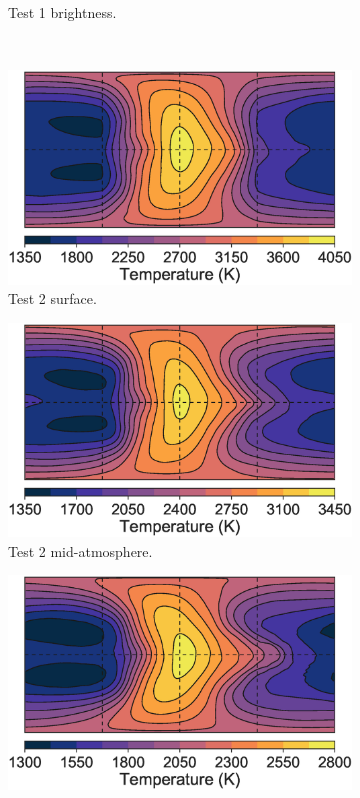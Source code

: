 \begin{figure}
\begin{subfigure}[t]{0.32\textwidth}
    \caption{Test 1 brightness.}
    \label{fig:free-h-shear}
  \end{subfigure}
  \\
  \begin{subfigure}[t]{0.32\textwidth}
    \includegraphics[width=\textwidth]{figures/linking-climate-55cnce/N2_surfp.eps}
    \caption{Test 2 surface.}
    \label{fig:free-u-shear}
  \end{subfigure}
\enskip
  \begin{subfigure}[t]{0.32\textwidth}
    \includegraphics[width=\textwidth]{figures/linking-climate-55cnce/N2_halfp.eps}
    \caption{Test 2 mid-atmosphere.}
    \label{fig:free-v-shear}
  \end{subfigure}
\enskip
  \begin{subfigure}[t]{0.32\textwidth}
    \includegraphics[width=\textwidth]{figures/linking-climate-55cnce/N2_brightT.eps}

\end{subfigure}
\end{figure}
